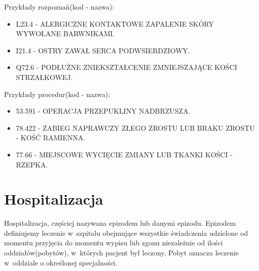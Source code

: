 Przykłady rozpoznań(kod - nazwa):
\begin{itemize}
\item L23.4 - ALERGICZNE KONTAKTOWE ZAPALENIE SKÓRY WYWOŁANE BARWNIKAMI.
\item I21.4 - OSTRY ZAWAŁ SERCA PODWSIERDZIOWY.
\item Q72.6 - PODŁUŻNE ZNIEKSZTAŁCENIE ZMNIEJSZAJĄCE KOŚCI STRZAŁKOWEJ.
\end{itemize}

Przykłady procedur(kod - nazwa):
\begin{itemize}
\item 53.591 - OPERACJA PRZEPUKLINY NADBRZUSZA.
\item 78.422 - ZABIEG NAPRAWCZY ZŁEGO ZROSTU LUB BRAKU ZROSTU - KOŚĆ RAMIENNA.
\item 77.66 - MIEJSCOWE WYCIĘCIE ZMIANY LUB TKANKI KOŚCI - RZEPKA.
\end{itemize}


\section{Hospitalizacja}
\label{sec:hospitalizacja}

Hospitalizacja, częściej nazywana epizodem lub danymi epizodu. Epizodem definiujemy leczenie w~szpitalu obejmujące wszystkie świadczenia udzielone od momentu przyjęcia do momentu wypisu lub zgonu niezależnie od ilości oddziałów(pobytów), w~których pacjent był leczony. Pobyt oznacza leczenie w~oddziale o określonej specjalności.

